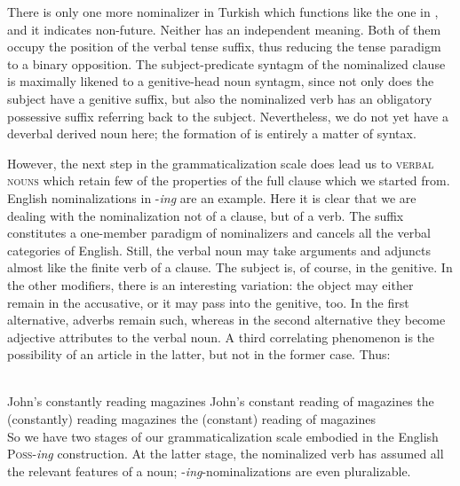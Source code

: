 \noindent There is only one more nominalizer in Turkish which functions like the one in , and it indicates non-future. Neither has an independent meaning. Both of them occupy the position of the verbal tense suffix, thus reducing the tense paradigm to a binary opposition. The subject-predicate syntagm of the nominalized clause is maximally likened to a genitive-head noun syntagm, since not only does the subject have a genitive suffix, but also the nominalized verb has an obligatory possessive suffix referring back to the subject. Nevertheless, we do not yet have a deverbal derived noun here; the formation of  is entirely a matter of syntax.

However, the next step in the grammaticalization scale does lead us to \textsc{verbal nouns} which retain few of the properties of the full clause which we started from. English nominalizations in -\textit{ing} are an example. Here it is clear that we are dealing with the nominalization not of a clause, but of a verb. The suffix constitutes a one-member paradigm of nominalizers and cancels all the verbal categories of English. Still, the verbal noun may take arguments and adjuncts almost like the finite verb of a clause. The subject is, of course, in the genitive. In the other modifiers, there is an interesting variation: the object may either remain in the accusative, or it may pass into the genitive, too. In the first alternative, adverbs remain such, whereas in the second alternative they become adjective attributes to the verbal noun. A third correlating phenomenon is the possibility of an article in the latter, but not in the former case. Thus:

\ea\label{ex:E30}
\langinfo{\LangEngl}{}{} \\
\ea John's constantly reading magazines
\ex John's constant reading of magazines
\ex *the (constantly) reading magazines
\ex the (constant) reading of magazines\\
\z
\z
\noindent So we have two stages of our grammaticalization scale embodied in the English \textsc{Poss}{}-\textit{ing} construction. At the latter stage, the nominalized verb has assumed all the relevant features of a noun; -\textit{ing}{}-nominalizations are even pluralizable.

